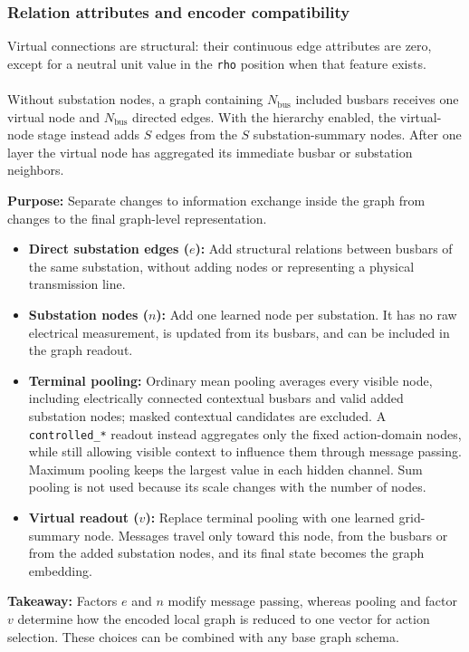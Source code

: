 \subsubsection{Relation attributes and encoder compatibility}
\label{subsec:virtual-node-compatibility}

Virtual connections are structural: their continuous edge attributes are zero,
except for a neutral unit value in the
\texttt{rho} position when that feature exists.
\\
\\
Without substation nodes, a graph containing $N_{\mathrm{bus}}$ included
busbars receives one virtual node and $N_{\mathrm{bus}}$ directed edges. With
the hierarchy enabled, the virtual-node stage instead adds $S$ edges from the
$S$ substation-summary nodes. After one layer the virtual node has aggregated
its immediate busbar or substation neighbors.

\begin{tcolorbox}[
  colframe=red!75!black,
  colback=red!5!white,
  title=Chapter Summary (2/3): Augmentations and Graph Readout
]
\textbf{Purpose:} Separate changes to information exchange inside the graph
from changes to the final graph-level representation.

\begin{itemize}
  \item \textbf{Direct substation edges ($e$):} Add structural relations between
  busbars of the same substation, without adding nodes or representing a
  physical transmission line.
  \item \textbf{Substation nodes ($n$):} Add one learned node per substation.
  It has no raw electrical measurement, is updated from its busbars, and can be
  included in the graph readout.
  \item \textbf{Terminal pooling:} Ordinary mean pooling averages every visible
  node, including electrically connected contextual busbars and valid added
  substation nodes; masked contextual candidates are excluded. A
  \texttt{controlled\_*} readout instead aggregates only the fixed action-domain
  nodes, while still allowing visible context to influence them through message
  passing. Maximum pooling keeps the largest value in each hidden channel. Sum
  pooling is not used because its scale changes with the number of nodes.
  \item \textbf{Virtual readout ($v$):} Replace terminal pooling with one learned
  grid-summary node. Messages travel only toward this node, from the busbars or
  from the added substation nodes, and its final state becomes the graph
  embedding.
\end{itemize}

\textbf{Takeaway:} Factors $e$ and $n$ modify message passing, whereas pooling
and factor $v$ determine how the encoded local graph is reduced to one vector
for action selection. These choices can be combined with any base graph schema.
\end{tcolorbox}

